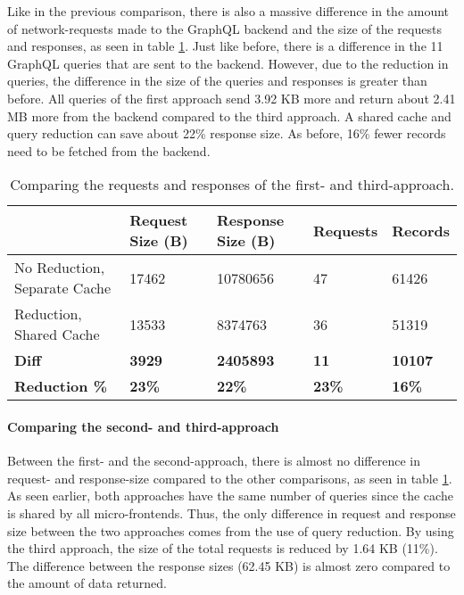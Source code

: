 Like in the previous comparison, there is also a massive difference in the amount of network-requests made to the GraphQL backend and the size of the requests and responses, as seen in table \ref{table:results:size-comparison-first-path-no-cache-no-reduction-cache-reduction}. Just like before, there is a difference in the 11 GraphQL queries that are sent to the backend. However, due to the reduction in queries, the difference in the size of the queries and responses is greater than before. All queries of the first approach send 3.92 KB more and return about 2.41 MB more from the backend compared to the third approach. A shared cache and query reduction can save about 22\% response size. As before, 16\% fewer records need to be fetched from the backend.

\ifshowTables
\begin{table}[H]
    \begin{tabular}{|l|l|l|l|l|}
    \hline
       & Request Size (B) & Response Size (B) & Requests & Records  \\
    \hline
     No Reduction, Separate Cache & 17462 & 10780656 & 47 & 61426 \\
     \hline
     Reduction, Shared Cache & 13533 & 8374763 & 36 & 51319 \\
     \hline
     \hline
     \textbf{Diff} & \textbf{3929} & \textbf{2405893} & \textbf{11} & \textbf{10107} \\
     \hline
    \textbf{Reduction \%} & \textbf{23\%} & \textbf{22\%} & \textbf{23\%} & \textbf{16\%} \\
     \hline
    \end{tabular}
    \caption{Comparing the requests and responses of the first- and third-approach.}
    \label{table:results:size-comparison-first-path-no-cache-no-reduction-cache-reduction}
\end{table}
\fi

\paragraph{Comparing the second- and third-approach}

Between the first- and the second-approach, there is almost no difference in request- and response-size compared to the other comparisons, as seen in table \ref{table:results:size-comparison-first-path-no-cache-no-reduction-cache-reduction}. As seen earlier, both approaches have the same number of queries since the cache is shared by all micro-frontends. Thus, the only difference in request and response size between the two approaches comes from the use of query reduction. By using the third approach, the size of the total requests is reduced by 1.64 KB (11\%). The difference between the response sizes (62.45 KB) is almost zero compared to the amount of data returned.

